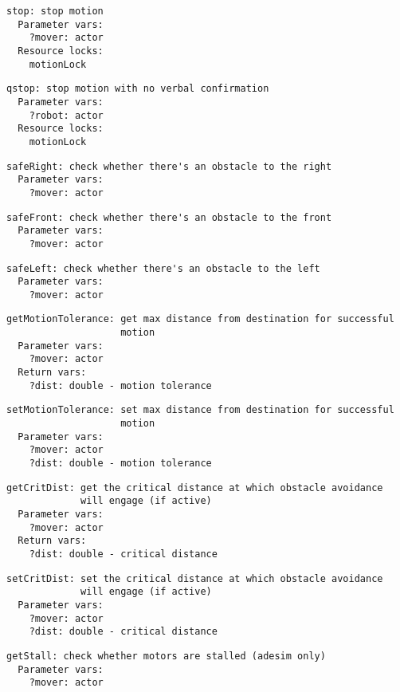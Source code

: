 \documentclass[11pt,letterpaper]{article}
\begin{document}
\begin{Verbatim}
stop: stop motion
  Parameter vars:
    ?mover: actor
  Resource locks:
    motionLock
\end{Verbatim}

\begin{Verbatim}
qstop: stop motion with no verbal confirmation
  Parameter vars:
    ?robot: actor
  Resource locks:
    motionLock
\end{Verbatim}

\begin{Verbatim}
safeRight: check whether there's an obstacle to the right
  Parameter vars:
    ?mover: actor
\end{Verbatim}

\begin{Verbatim}
safeFront: check whether there's an obstacle to the front
  Parameter vars:
    ?mover: actor
\end{Verbatim}

\begin{Verbatim}
safeLeft: check whether there's an obstacle to the left
  Parameter vars:
    ?mover: actor
\end{Verbatim}

\begin{Verbatim}
getMotionTolerance: get max distance from destination for successful
                    motion
  Parameter vars:
    ?mover: actor
  Return vars:
    ?dist: double - motion tolerance
\end{Verbatim}

\begin{Verbatim}
setMotionTolerance: set max distance from destination for successful
                    motion
  Parameter vars:
    ?mover: actor
    ?dist: double - motion tolerance
\end{Verbatim}

\begin{Verbatim}
getCritDist: get the critical distance at which obstacle avoidance 
             will engage (if active)
  Parameter vars:
    ?mover: actor
  Return vars:
    ?dist: double - critical distance
\end{Verbatim}

\begin{Verbatim}
setCritDist: set the critical distance at which obstacle avoidance
             will engage (if active)
  Parameter vars:
    ?mover: actor
    ?dist: double - critical distance
\end{Verbatim}

\begin{Verbatim}
getStall: check whether motors are stalled (adesim only)
  Parameter vars:
    ?mover: actor
\end{Verbatim}
\end{document}
